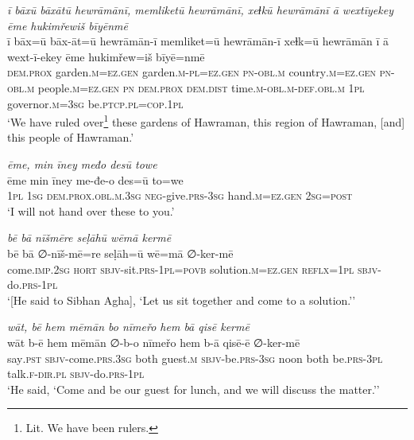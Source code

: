 \ea \label{DP.21}
\textit{ī bāxū bāxātū hewrāmānī, memliketū hewrāmānī, xeɫkū hewrāmānī ā wextīyekey ēme hukimřewiš bīyēnmē} \\ 
\gll ī bāx=ū bāx-āt=ū hewrāmān-ī memliket=ū hewrāmān-ī xeɫk=ū hewrāmān ī ā wext-ī-ekey ēme hukimřew=iš bīyē=nmē \\ 
 \textsc{dem.prox} garden\textsc{.m}\textsc{=ez}\textsc{.gen} garden\textsc{.m}\textsc{-pl}\textsc{=ez}\textsc{.gen} \textsc{pn}\textsc{-obl}\textsc{.m} country\textsc{.m}\textsc{=ez}\textsc{.gen} \textsc{pn}\textsc{-obl}\textsc{.m} people\textsc{.m}\textsc{=ez}\textsc{.gen} \textsc{pn} \textsc{dem.prox} \textsc{dem.dist} time\textsc{.m}\textsc{-obl}\textsc{.m}\textsc{-def}\textsc{.obl}\textsc{.m} \textsc{1pl} governor\textsc{.m}\textsc{=3sg} be\textsc{.ptcp}\textsc{.pl}\textsc{=cop}\textsc{.1pl} \\ 
\glt `We have ruled over\footnote{Lit. We have been rulers.} these gardens of Hawraman, this region of Hawraman, [and] this people of Hawraman.'
\z 
 
\ea \label{DP.22}
\textit{ēme, min īney međo desū towe} \\ 
\gll ēme min īney me-đe-o des=ū to=we \\ 
 \textsc{1pl} \textsc{1sg} \textsc{dem.prox}\textsc{.obl}\textsc{.m}\textsc{.3sg} \textsc{neg-}give\textsc{.prs}\textsc{-3sg} hand\textsc{.m}\textsc{=ez}\textsc{.gen} \textsc{2sg}\textsc{=\textsc{post}} \\ 
\glt `I will not hand over these to you.'
\z 
 
\ea \label{DP.39}
\textit{bē bā nīšmēre seḷāhū wēmā kermē} \\ 
\gll bē bā ∅-nīš-mē=re seḷāh=ū wē=mā ∅-ker-mē \\ 
 come\textsc{.imp}\textsc{.\textsc{2sg}} \textsc{hort} \textsc{sbjv-}sit\textsc{.prs}\textsc{-1pl}\textsc{=\textsc{povb}} solution\textsc{.m}\textsc{=ez}\textsc{.gen} \textsc{reflx}\textsc{=1pl} \textsc{sbjv-}do\textsc{.prs}\textsc{-1pl} \\ 
\glt `[He said to Sibhan Agha], ‘Let us sit together and come to a solution.’'
\z 
 
\ea \label{DP.44}
\textit{wāt, bē hem mēmān bo nīmeřo hem bā qisē kermē} \\ 
\gll wāt b-ē hem mēmān ∅-b-o nīmeřo hem b-ā qisē-ē ∅-ker-mē \\ 
 say\textsc{.pst} \textsc{sbjv-}come\textsc{.prs}\textsc{.3sg} both guest\textsc{.m} \textsc{sbjv-}be\textsc{.prs}\textsc{-3sg} noon both be\textsc{.prs}\textsc{-3pl} talk\textsc{\textsc{.f}}\textsc{-dir}\textsc{.pl} \textsc{sbjv-}do\textsc{.prs}\textsc{-1pl} \\ 
\glt `He said, ‘Come and be our guest for lunch, and we will discuss the matter.’'
\z 
 
